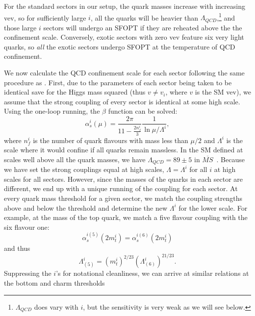 \documentclass[nofootinbib,twocolumn,preprintnumbers]{revtex4-1}
\begin{document}
For the standard sectors in our setup, the quark masses increase with increasing vev, so for sufficiently large $i$, all the quarks will be heavier than $\Lambda_{QCD}$,\footnote{$\Lambda_{QCD}$ does vary with $i$, but the sensitivity is very weak as we will see below.} and those large $i$ sectors will undergo an SFOPT if they are reheated above the the confinement scale. 
Conversely, exotic sectors with zero vev feature six very light quarks, so \textit{all} the exotic sectors undergo SFOPT at the temperature of QCD confinement. 

We now calculate the QCD confinement scale for each sector following the same procedure as \cite{Cui:2011wk}. First, due to the parameters of each sector being taken to be identical save for the Higgs mass squared (thus $v \neq v_i$, where $v$ is the SM vev), we assume that the strong coupling of every sector is identical at some high scale. Using the one-loop running, the $\beta$ function can be solved:
\begin{equation}\label{eqn:QCDrunningi}
\alpha_{s}^i (\mu) = \frac{2\pi}{11-\frac{2n^i_f}{3}}\frac{1}{\ln{\mu/\Lambda^i}},
\end{equation}
where $n_f^i$ is the number of quark flavours with mass less than $\mu/2$ and $\Lambda^i$ is the scale where it would confine if all quarks remain massless. In the SM defined at scales well above all the quark masses, we have $\Lambda_{QCD} = 89 \pm 5$ in $\overline{MS}$~\cite{PhysRevD.98.030001}. 
Because we have set the strong couplings equal at high scales, $\Lambda = \Lambda^i$ for all $i$ at high scales for all sectors. However, since the masses of the quarks in each sector are different, we end up with a unique running of the coupling for each sector. At every quark mass threshold for a given sector, we match the coupling strengths above and below the threshold and determine the new $\Lambda^i$ for the lower scale. For example, at the mass of the top quark, we match a five flavour coupling with the six flavour one:
\begin{equation}
\alpha_s^{i(5)}(2 m^i_t) = \alpha_s^{i(6)}(2 m^i_t) 
\end{equation} 
and thus
\begin{equation}
\Lambda_{(5)}^i = (m_t^{i})^{2/23}(\Lambda_{(6)}^i)^{21/23}.
\end{equation}
Suppressing the $i$'s for notational cleanliness, we can arrive at similar relations at the bottom and charm thresholds
\end{document}
